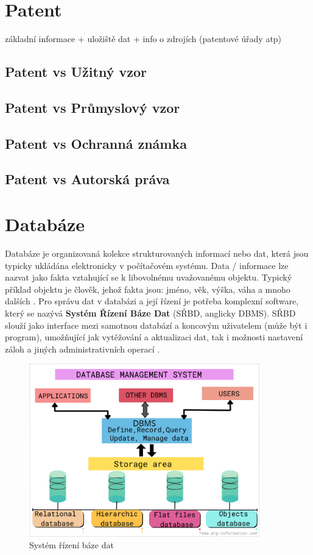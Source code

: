 \chapter{Patent}
základní informace + uložiště dat + info o zdrojích (patentové úřady atp) \newline
\section{Patent vs Užitný vzor}
\section{Patent vs Průmyslový vzor}
\section{Patent vs Ochranná známka}
\section{Patent vs Autorská práva}



\chapter{Databáze}

Databáze je organizovaná kolekce strukturovaných informací nebo dat, která jsou typicky ukládána elektronicky v počítačovém systému. Data / informace lze nazvat jako fakta vztahující se k libovolnému uvažovanému objektu. Typický příklad objektu je člověk, jehož fakta jsou: jméno, věk, výška, váha a mnoho dalších \cite{guru99Database}.\newline
\indent Pro správu dat v databázi a její řízení je potřeba komplexní software, který se nazývá \textbf{Systém Řízení Báze Dat} (SŘBD, anglicky DBMS). SŘBD slouží jako interface mezi samotnou databází a koncovým uživatelem (může být i program), umožňující jak vytěžování a aktualizaci dat, tak i možnosti nastavení záloh a jiných administrativních operací \cite{OracleDB}.
\begin{figure}[h!]
\centering
\includegraphics[width=10cm]{img/dbms}
\caption{Systém řízení báze dat}
\label{fig:dbms}
\end{figure}

